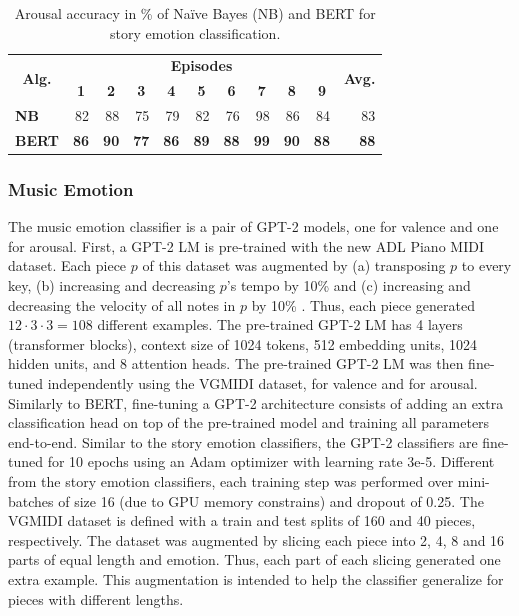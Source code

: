 \begin{table}[!h]
\centering
\setlength{\tabcolsep}{4pt}
\begin{tabular}{crrrrrrrrrr}
\toprule
\multirow{2}{*}{\textbf{Alg.}} & \multicolumn{9}{c}{\textbf{Episodes}} & \multirow{2}{*}{\textbf{Avg.}} \\
\cmidrule{2-10}
& \multicolumn{1}{c}{\textbf{1}}   & \multicolumn{1}{c}{\textbf{2}}   & \multicolumn{1}{c}{\textbf{3}}  & \multicolumn{1}{c}{\textbf{4}} & \multicolumn{1}{c}{\textbf{5}}  & \multicolumn{1}{c}{\textbf{6}}  & \multicolumn{1}{c}{\textbf{7}} & \multicolumn{1}{c}{\textbf{8}}  & \multicolumn{1}{c}{\textbf{9}} &    \\
\midrule
\multicolumn{1}{l}{\textbf{NB}}   &   82 & 88  &  75 & 79   &  82 & 76  &  98 & 86   & 84    &   83 \\
\multicolumn{1}{l}{\textbf{BERT}}   &  \textbf{86}  & \textbf{90}  & \textbf{77}  &  \textbf{86} & \textbf{89}   & \textbf{88} & \textbf{99}   &  \textbf{90}   &  \textbf{88} &  \textbf{88}  \\
\bottomrule
\end{tabular}
\caption{Arousal accuracy in \% of Na\"ive Bayes (NB) and BERT for story emotion classification.}
\label{tab:arousal}
\end{table}

\subsubsection{Music Emotion}

The music emotion classifier is a pair of GPT-2 models, one for valence and one for arousal. First, a GPT-2 LM is pre-trained with the new ADL Piano MIDI dataset. Each piece $p$ of this dataset was augmented by (a) transposing $p$ to every key, (b) increasing and decreasing $p$'s tempo by 10\% and (c) increasing and decreasing the velocity of all notes in $p$ by 10\% \cite{oore2017learning}. Thus, each piece generated $12 \cdot 3 \cdot 3 = 108$ different examples. The pre-trained GPT-2 LM has 4 layers (transformer blocks), context size of 1024 tokens, 512 embedding units, 1024 hidden units, and 8 attention heads. The pre-trained GPT-2 LM was then fine-tuned  independently using the VGMIDI dataset, for valence and for arousal. Similarly to BERT, fine-tuning a GPT-2 architecture consists of adding an extra classification head on top of the pre-trained model and training all parameters end-to-end. Similar to the story emotion classifiers, the GPT-2 classifiers are fine-tuned for 10 epochs using an Adam optimizer with learning rate 3e-5. Different from the story emotion classifiers, each training step was performed over mini-batches of size 16 (due to GPU memory constrains) and dropout of 0.25. The VGMIDI dataset is defined with a train and test splits of 160 and 40 pieces, respectively. The dataset was augmented by slicing each piece into 2, 4, 8 and 16 parts of equal length and emotion. Thus, each part of each slicing generated one extra example. This augmentation is intended to help the classifier generalize for pieces with different lengths.

